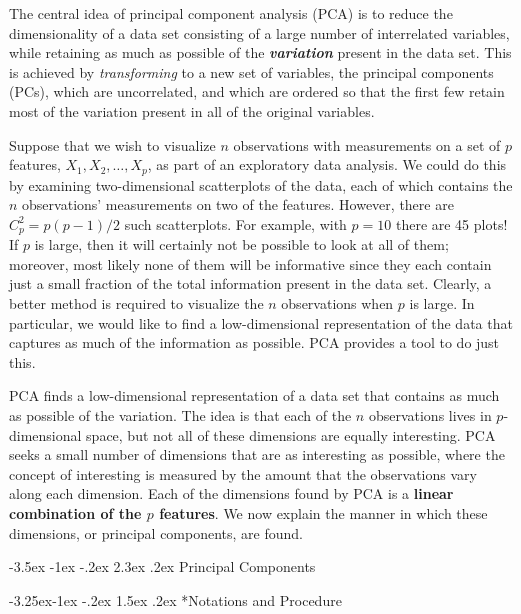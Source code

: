 \documentclass[]{book}
\makeatletter
\renewcommand\section{\@startsection {section}{1}{\z@}%
                                   {-3.5ex \@plus -1ex \@minus -.2ex}%
                                   {2.3ex \@plus.2ex}%
                                   {\normalfont\Large\bfseries\color{ForestGreen}}}
\renewcommand\subsection{\@startsection{subsection}{2}{\z@}%
                                     {-3.25ex\@plus -1ex \@minus -.2ex}%
                                     {1.5ex \@plus .2ex}%
                                     {\normalfont\large\bfseries\color{Violet}}}
\theoremstyle{definition}
\theoremstyle{definition}
\theoremstyle{definition}
\theoremstyle{remark}
\makeatother
\begin{document}
The central idea of principal component analysis (PCA) is to reduce the
dimensionality of a data set consisting of a large number of
interrelated variables, while retaining as much as possible of the
\textbf{\emph{variation}} present in the data set. This is achieved by
\emph{transforming} to a new set of variables, the principal components
(PCs), which are uncorrelated, and which are ordered so that the first
few retain most of the variation present in all of the original
variables.

Suppose that we wish to visualize \(n\) observations with measurements
on a set of \(p\) features, \(X_1,X_2,\ldots,X_p\), as part of an
exploratory data analysis. We could do this by examining two-dimensional
scatterplots of the data, each of which contains the \(n\) observations'
measurements on two of the features. However, there are
\(C_p^2 = p(p−1)/2\) such scatterplots. For example, with \(p =10\)
there are 45 plots! If \(p\) is large, then it will certainly not be
possible to look at all of them; moreover, most likely none of them will
be informative since they each contain just a small fraction of the
total information present in the data set. Clearly, a better method is
required to visualize the \(n\) observations when \(p\) is large. In
particular, we would like to find a low-dimensional representation of
the data that captures as much of the information as possible. PCA
provides a tool to do just this.

PCA finds a low-dimensional representation of a data set that contains
as much as possible of the variation. The idea is that each of the \(n\)
observations lives in \(p\)-dimensional space, but not all of these
dimensions are equally interesting. PCA seeks a small number of
dimensions that are as interesting as possible, where the concept of
interesting is measured by the amount that the observations vary along
each dimension. Each of the dimensions found by PCA is a \textbf{linear
combination of the \(p\) features}. We now explain the manner in which
these dimensions, or principal components, are found.

\section{Principal Components}\label{principal-components}

\subsection*{Notations and Procedure}\label{notations-and-procedure}
\end{document}
